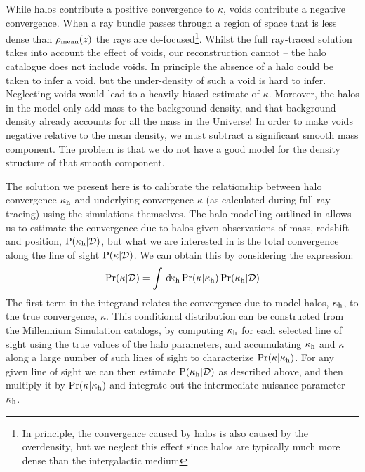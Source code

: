 \documentclass[useAMS,usenatbib]{mn2e}
\begin{document}
While halos contribute a positive convergence to $\kappa$, voids contribute
a negative convergence. When a ray bundle passes through a  region of space
that is less dense than $\rho_{\rm mean}(z)$ the rays are de-focused\footnote{In
principle, the convergence caused by halos is also caused by the overdensity,
but we neglect this effect since halos are typically much more dense than the
intergalactic medium}. Whilst the  full ray-traced solution takes into account
the effect of voids, our reconstruction cannot -- the halo catalogue does not
include voids. In principle the absence of a halo could be taken to infer a
void, but the under-density of such a void is hard to infer. Neglecting voids
would lead to a heavily biased estimate of $\kappa$. Moreover, the halos in 
the model only add mass to the background density, and that background density
already accounts for all the mass in the Universe! In order to make voids
negative relative to the mean density, we must subtract a significant smooth
mass component. The problem is that we do not have a good model for the
density structure of that smooth component. 

The solution we present here is to calibrate the relationship between halo
convergence $\kappa_{\rm h}$ and underlying convergence $\kappa$ (as calculated
during full ray tracing) using the simulations themselves.
The halo modelling \proceedure outlined in  allows 
us to estimate 
the convergence due to halos given observations of 
mass, redshift and position,
${\rm P}(\kappa_{\rm h}|\mathcal{D})$, but what we are interested in is the total convergence
along the line of sight ${\rm P}(\kappa|\mathcal{D})$. We can obtain this by
considering the expression:
\begin{equation}
\Pr(\kappa|\mathcal{D}) = \int \, \mathrm{d} \!\kappa_{\rm h} 
   \Pr(\kappa|\kappa_{\rm h}) \Pr(\kappa_{\rm h}|\mathcal{D})
\label{eq:kappaconv}   
\end{equation}
The first term in the integrand relates the convergence due to model halos,
$\kappa_{\rm h}$, to the true convergence, $\kappa$. This conditional distribution
can be constructed from the Millennium Simulation catalogs, by computing
$\kappa_{\rm h}$ for each selected line of sight using the true values of the halo
parameters,  and accumulating $\kappa_{\rm h}$ and $\kappa$ along a large number of
such lines of
sight to  characterize $\Pr(\kappa|\kappa_{\rm h})$.
For any given line of sight we can then estimate
${\rm P}(\kappa_{\rm h}|{\mathcal{D}})$ as described above, and then
multiply it by $\Pr(\kappa|\kappa_{\rm h})$ and integrate out the intermediate
nuisance parameter $\kappa_{\rm h}$. 
\end{document}
